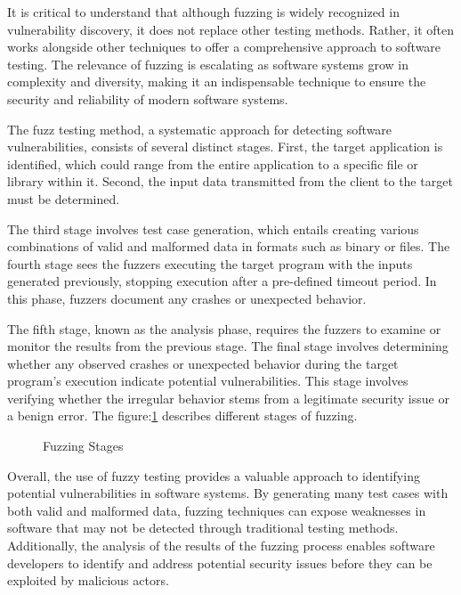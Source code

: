 It is critical to understand that although fuzzing is widely recognized in vulnerability discovery,
it does not replace other testing methods. Rather, it often works alongside other techniques to offer
a comprehensive approach to software testing. The relevance of fuzzing is escalating as software
systems grow in complexity and diversity, making it an indispensable technique to ensure the security
and reliability of modern software systems\cite{kim2011efficient}.

The fuzz testing method, a systematic approach for detecting software vulnerabilities,
consists of several distinct stages. First, the target application is identified, which
could range from the entire application to a specific file or library within it\cite{segedyfuzz}.
Second, the input data transmitted from the client to the target must be determined.

The third stage involves test case generation, which entails creating various combinations of
valid and malformed data in formats such as binary or files. The fourth stage sees the fuzzers
executing the target program with the inputs generated previously, stopping execution after a
pre-defined timeout period. In this phase, fuzzers document any crashes or unexpected behavior.

The fifth stage, known as the analysis phase, requires the fuzzers to examine or monitor the
results from the previous stage. The final stage involves determining whether any observed crashes
or unexpected behavior during the target program's execution indicate potential vulnerabilities.
This stage involves verifying whether the irregular behavior stems from a legitimate
security issue or a benign error.
The figure:\ref{fig:fuzzy_testing_phases_1} describes different stages of fuzzing.


\begin{figure}[h]
        \centering
        \caption{Fuzzing Stages\cite{segedyfuzz}\cite{9742291}}\label{fig:fuzzy_testing_phases_1}
\end{figure}

Overall, the use of fuzzy testing provides a valuable approach to identifying potential
vulnerabilities in software systems. By generating many test cases with both
valid and malformed data, fuzzing techniques can expose weaknesses in software that may not be
detected through traditional testing methods. Additionally, the analysis of the results of the
fuzzing process enables software developers to identify and address potential security issues
before they can be exploited by malicious actors.

